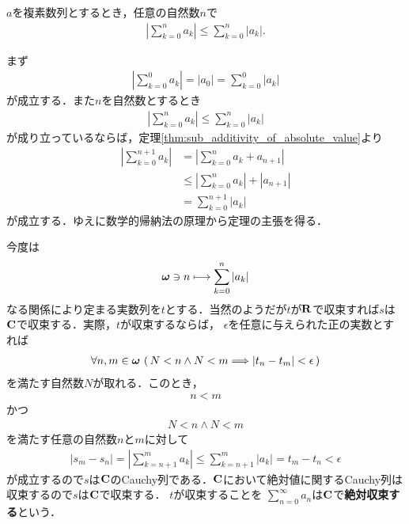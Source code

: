 	\begin{screen}
		\begin{thm}[和の絶対値と絶対値の和]
			$a$を複素数列とするとき，任意の自然数$n$で
			\begin{align}
				\left|\sum_{k=0}^{n} a_{k}\right| \leq \sum_{k=0}^{n} |a_{k}|.
			\end{align}
		\end{thm}
	\end{screen}
	
	\begin{sketch}
		まず
		\begin{align}
			\left|\sum_{k=0}^{0} a_{k}\right| = |a_{0}| = \sum_{k=0}^{0} |a_{k}|
		\end{align}
		が成立する．また$n$を自然数とするとき
		\begin{align}
			\left|\sum_{k=0}^{n} a_{k}\right| \leq \sum_{k=0}^{n} |a_{k}|
		\end{align}
		が成り立っているならば，定理\ref{thm:sub_additivity_of_absolute_value}より
		\begin{align}
			\left|\sum_{k=0}^{n+1} a_{k}\right|
			&= \left|\sum_{k=0}^{n} a_{k} + a_{n+1}\right| \\
			&\leq \left|\sum_{k=0}^{n} a_{k}\right| + |a_{n+1}| \\
			&= \sum_{k=0}^{n+1} |a_{k}|
		\end{align}
		が成立する．ゆえに数学的帰納法の原理から定理の主張を得る．
		\QED
	\end{sketch}
	
	今度は
	\begin{align}
		{\boldsymbol \omega} \ni n \longmapsto \sum_{k=0}^n |a_k|
	\end{align}
	なる関係により定まる実数列を$t$とする．当然のようだが$t$が$\mathbf{R}$で収束すれば$s$は$\mathbf{C}$で収束する．実際，$t$が収束するならば，
	$\epsilon$を任意に与えられた正の実数とすれば
	\begin{align}
		\forall n,m \in {\boldsymbol \omega}\, \left(\, N < n \wedge N < m \Longrightarrow 
		|t_n - t_m| < \epsilon\, \right)
	\end{align}
	を満たす自然数$N$が取れる．このとき，
	\begin{align}
		n < m
	\end{align}
	かつ
	\begin{align}
		N < n \wedge N < m
	\end{align}
	を満たす任意の自然数$n$と$m$に対して
	\begin{align}
		|s_m - s_n| = \left|\sum_{k=n+1}^m a_k\right| \leq \sum_{k=n+1}^m |a_k| = t_m - t_n < \epsilon
	\end{align}
	が成立するので$s$は$\mathbf{C}$のCauchy列である．$\mathbf{C}$において絶対値に関するCauchy列は収束するので$s$は$\mathbf{C}$で収束する．
	$t$が収束することを
	$\sum_{n=0}^\infty a_n$は$\mathbf{C}$で{\bf 絶対収束する}という．
	
